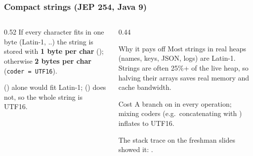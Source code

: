 \documentclass[aspectratio=169,10pt,compress]{beamer}
\begin{document}
\begin{frame}[t,fragile] \frametitle{Compact strings (JEP 254, Java 9)}
  \begin{columns}[T]
    \begin{column}{0.52\textwidth}
      \small If every character fits in one byte (Latin-1, ..) the string is stored
      with \textbf{1 byte per char} (); otherwise \textbf{2 bytes per char} (\texttt{coder = UTF16}).
      \vspace{0.4em}


      \vspace{0.3em}
      \small {} () alone would fit Latin-1; 
       () does not, so the whole string is UTF16.
    \end{column}
    \begin{column}{0.44\textwidth}
      \begin{block}{Why it pays off}
        \small Most strings in real heaps (names, keys, JSON, logs) are Latin-1. 
        Strings are often 25\%+ of the live heap,
        so halving their arrays saves real memory and cache bandwidth.
      \end{block}
      \begin{block}{Cost}
        \small A branch on  in every operation; mixing coders 
        (e.g.\ concatenating with ) inflates to UTF16.
      \end{block}
      \small The stack trace on the freshman slides showed it: .
    \end{column}
  \end{columns}
\end{frame}
\end{document}
